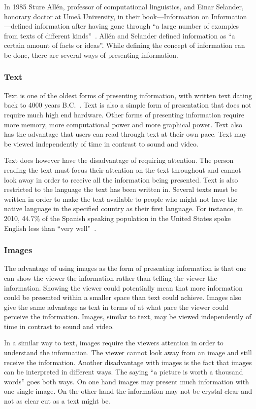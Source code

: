 In 1985 Sture All{\'e}n, professor of computational linguistics, and Einar Selander, honorary doctor at Ume{\aa} University, in their book---Information on Information---defined information after having gone through ``a large number of examples from texts of different kinds''~\cite{informationDef1}. All{\'e}n and Selander defined information as ``a certain amount of facts or ideas''. While defining the concept of information can be done, there are several ways of presenting information.

\subsubsection{Text}
Text is one of the oldest forms of presenting information, with written text dating back to 4000 years B.C.~\cite{cuneiform}. Text is also a simple form of presentation that does not require much high end hardware. Other forms of presenting information require more memory, more computational power and more graphical power. Text also has the advantage that users can read through text at their own pace. Text may be viewed independently of time in contrast to sound and video.

Text does however have the disadvantage of requiring attention. The person reading the text must focus their attention on the text throughout and cannot look away in order to receive all the information being presented. Text is also restricted to the language the text has been written in. Several texts must be written in order to make the text available to people who might not have the native language in the specified country as their first language. For instance, in 2010, 44.7\% of the Spanish speaking population in the United States spoke English less than ``very well''~\cite{spanishUS}.

\subsubsection{Images}
The advantage of using images as the form of presenting information is that one can show the viewer the information rather than telling the viewer the information. Showing the viewer could potentially mean that more information could be presented within a smaller space than text could achieve. Images also give the same advantage as text in terms of at what pace the viewer could perceive the information. Images, similar to text, may be viewed independently of time in contrast to sound and video.

In a similar way to text, images require the viewers attention in order to understand the information. The viewer cannot look away from an image and still receive the information. Another disadvantage with images is the fact that images can be interpreted in different ways. The saying ``a picture is worth a thousand words'' goes both ways. On one hand images may present much information with one single image. On the other hand the information may not be crystal clear and not as clear cut as a text might be.

